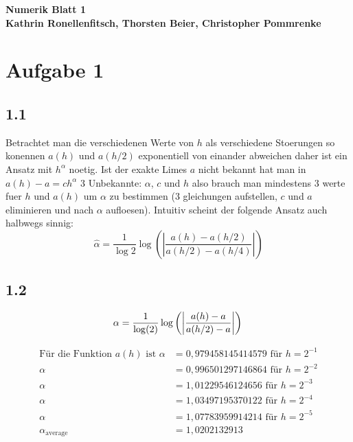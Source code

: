 \documentclass[10pt,oneside,a4paper]{scrartcl}
\begin{document}

	\begin{center}
		\huge %
		\bfseries %
		\sffamily %
		Numerik Blatt 1\\[1em]
		\normalsize
		Kathrin Ronellenfitsch, Thorsten Beier, Christopher Pommrenke
	\end{center}

	
	\section*{Aufgabe 1}
    \subsection*{1.1}
    Betrachtet man die verschiedenen Werte von $h$ als verschiedene Stoerungen
    so konennen  $a(h)$ und $a(h/2)$  exponentiell von einander abweichen daher
    ist ein Ansatz mit $h^{\alpha}$ noetig. Ist der exakte Limes $a$ nicht
    bekannt hat man  in $a(h)-a=ch^{\alpha}$ 3 Unbekannte: $\alpha$, $c$ und $h$
    also brauch man mindestens 3 werte fuer $h$ und $a(h)$ um $\alpha$ zu
    bestimmen (3 gleichungen aufstellen, $c$ und $a$ eliminieren und nach
    $\alpha$ aufloesen). Intuitiv scheint der folgende Ansatz auch halbwegs
    sinnig:
    \begin{equation*}
        \hat{\alpha}= \frac{1} { \log{2}} \log{\left( \left| \frac{a(h)-a(h/2)}{a(h/2)-a(h/4)}\right|\right) }
    \end{equation*} 

	\subsection*{1.2}

	\begin{equation*}
		\alpha = \frac{1}{\log(2)}\log \left( \left|\frac{a(h)-a}{a(h/2)-a}\right| \right)\\
	\end{equation*}

	\begin{align*}
		\text {Für die Funktion } a(h) \text { ist } \alpha &= 0,979458145414579 \text { für } h = 2^{-1} \\
		\alpha &= 0,996501297146864 \text { für } h = 2^{-2} \\
		\alpha &= 1,01229546124656 \text { für } h = 2^{-3} \\
		\alpha &= 1,03497195370122 \text { für } h = 2^{-4} \\
		\alpha &= 1,07783959914214 \text { für } h = 2^{-5} \\
		\alpha_{\text{average}} &= 1,0202132913
	\end{align*}
\end{document}
